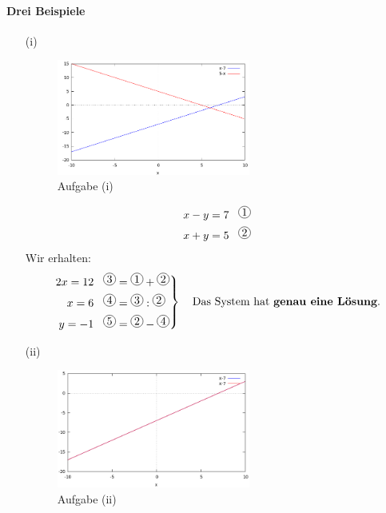 \documentclass[11pt]{report}
\newcommand*\mycirc[1]{%
  \begin{tikzpicture}
    \node[draw,circle,inner sep=1pt] {#1};
  \end{tikzpicture}}
\begin{document}
\paragraph{Drei Beispiele}
\begin{itemize}
\item[(i)]

\begin{figure}[ht]
\centering
\includegraphics[width=0.6\textwidth]{img/i.png}
\caption{Aufgabe (i)}
\end{figure}

\begin{align}
x - y &= 7 \hspace*{0.3cm}\mycirc{1}\\
x + y &= 5 \hspace*{0.3cm}\mycirc{2}
\end{align}
Wir erhalten:
\begin{equation}
\left.
\begin{aligned}
2x = 12 &\hspace*{0.3cm}\mycirc{3} = \mycirc{1} + \mycirc{2} \\
x = 6 &\hspace*{0.3cm}\mycirc{4} = \mycirc{3} : \mycirc{2} \\
y = -1 &\hspace*{0.3cm}\mycirc{5} = \mycirc{2} - \mycirc{4}
\end{aligned}
\right\}
\quad\text{Das System hat \textbf{genau eine Lösung}.}
\end{equation}
    
\item[(ii)]

\begin{figure}[ht]
\centering
\includegraphics[width=0.6\textwidth]{img/ii.png}
\caption{Aufgabe (ii)}
\end{figure}


\end{itemize}
\end{document}
